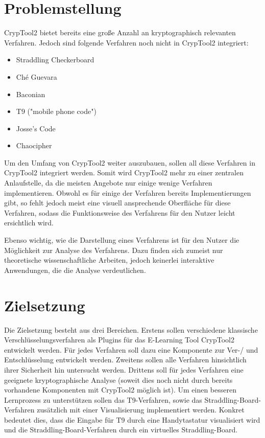 \documentclass[fontsize=11pt, paper=a4, parskip=half]{scrartcl}
\begin{document}
\section{Problemstellung}
CrypTool2 bietet bereits eine große Anzahl an kryptographisch relevanten Verfahren. Jedoch sind folgende Verfahren noch nicht in CrypTool2 integriert:
\begin{itemize}
	\item{Straddling Checkerboard} \cite{kahn1996codebreakers} \cite{Rijmenants2011THECG} \cite{Kuhlemann2020SpionageChiffreStraddlingCheckerboard} \cite{Goebel2020TheRiseOfFieldCiphers}
	\item{Ché Guevara } \cite{Kuhlemann2020CheGuevaraChiffre}
	\item{Baconian} \cite{Goldman2017WilliamFriedmanGeneticistTurnedCryptographer}
	\item{T9 ("mobile phone code")} \cite{groverKingKushler1998ReducedKeyboardDisambiguatingComputer}
	\item{Josse's Code} \cite{GeraudStewart2020AFrenchCipherFromTheLate19thCentury}
	\item{Chaocipher} \cite{Rubin2011JohnFByrnesChaocipherRevealed} \cite{scheffler2010Chaocipher} \cite{Rubin2020TheChaocipherClearingHouse} \cite{Hill2009CHAOCIPHERANALYSISANDMODELS} \cite{Cowan2010CHAOCIPHERSOLVINGEXHIBITS1and4} \cite{Rubin2010CHAOCIPHERREVEALEDTHEALGORITHM}
\end{itemize}

Um den Umfang von CrypTool2 weiter auszubauen, sollen all diese Verfahren in CrypTool2 integriert werden. Somit wird CrypTool2 mehr zu einer zentralen Anlaufstelle, da die meisten Angebote nur einige wenige Verfahren implementieren. Obwohl es für einige der Verfahren bereits Implementierungen gibt, so fehlt jedoch meist eine visuell ansprechende Oberfläche für diese Verfahren, sodass die Funktionsweise des Verfahrens für den Nutzer leicht ersichtlich wird.

Ebenso wichtig, wie die Darstellung eines Verfahrens ist für den Nutzer die Möglichkeit zur Analyse des Verfahrens. Dazu finden sich zumeist nur theoretische wissenschaftliche Arbeiten, jedoch keinerlei interaktive Anwendungen, die die Analyse verdeutlichen.

\section{Zielsetzung}
Die Zielsetzung besteht aus drei Bereichen. Erstens sollen verschiedene klassische Verschlüsselungsverfahren als Plugins für das E-Learning Tool CrypTool2 entwickelt werden. Für jedes Verfahren soll dazu eine Komponente zur Ver-/ und Entschlüsselung entwickelt werden. Zweitens sollen alle Verfahren hinsichtlich ihrer Sicherheit hin untersucht werden. Drittens soll für jedes Verfahren eine geeignete kryptographische Analyse  (soweit dies noch nicht durch bereits vorhandene Komponenten mit CrypTool2 möglich ist). Um einen besseren Lernprozess zu unterstützen sollen das T9-Verfahren, sowie das Straddling-Board-Verfahren zusätzlich mit einer Visualisierung implementiert werden. Konkret bedeutet dies, dass die Eingabe für T9 durch eine Handytastatur visualisiert wird und die Straddling-Board-Verfahren durch ein virtuelles Straddling-Board.
\end{document}
